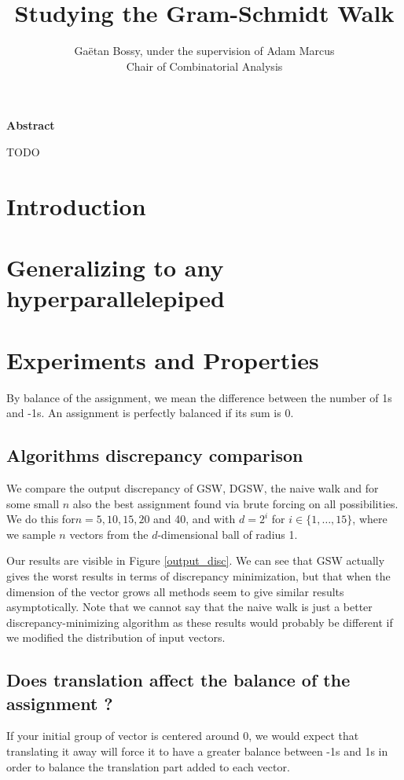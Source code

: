 \documentclass[12pt]{article}
\title{Studying the Gram-Schmidt Walk}
\author{Gaëtan Bossy, under the supervision of Adam Marcus\\Chair of Combinatorial Analysis}
\begin{document}
\maketitle
\begin{center}\bf Abstract\end{center}
\small TODO
\section{Introduction}
\section{Generalizing to any hyperparallelepiped}
\section{Experiments and Properties}
By balance of the assignment, we mean the difference between the number of 1s and -1s. An assignment is perfectly balanced if its sum is 0.

\subsection{Algorithms discrepancy comparison}
We compare the output discrepancy of GSW, DGSW, the naive walk and for some small $n$ also the best assignment found via brute forcing on all possibilities. We do this for$n=5,10,15,20$ and 40, and with $d=2^i$ for $i\in\{1,\dots,15\}$, where we sample $n$ vectors from the $d$-dimensional ball of radius 1.

Our results are visible in Figure \ref{output_disc}. We can see that GSW actually gives the worst results in terms of discrepancy minimization, but that when the dimension of the vector grows all methods seem to give similar results asymptotically. Note that we cannot say that the naive walk is just a better discrepancy-minimizing algorithm as these results would probably be different if we modified the distribution of input vectors.

\subsection{Does translation affect the balance of the assignment ?}\label{trans_balance}
If your initial group of vector is centered around 0, we would expect that translating it away will force it to have a greater balance between -1s and 1s in order to balance the translation part added to each vector.
\end{document}
